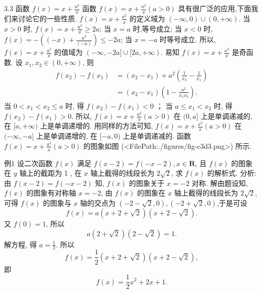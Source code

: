 3.3 函数 $f(x)=x+\frac{a^2}{x}$
函数 $f(x)=x+\frac{a^2}{x}(a>0)$ 具有很广泛的应用,下面我们来讨论它的一些性质.
$f(x)=x+\frac{a^2}{x}$ 的定义域为 $(-\infty, 0) \cup(0,+\infty)$.
当 $x>0$ 时, $f(x)=x+\frac{a^2}{x} \geqslant 2 a$;
当 $x=a$ 时,等号成立;
当 $x<0$ 时, $f(x)=-\left((-x)+\frac{a^2}{(-x)}\right) \leqslant-2 a$;
当 $x=-a$ 时等号成立.
所以, $f(x)=x+\frac{a^2}{x}$ 的值域为 $(-\infty,-2 a] \cup[2 a,+\infty)$.
易知 $f(x)=x+\frac{a^2}{x}$ 是奇函数.
设 $x_1, x_2 \in(0,+\infty)$, 则
$$
\begin{aligned}
f\left(x_2\right)-f\left(x_1\right) & =\left(x_2-x_1\right)+a^2\left(\frac{1}{x_2}-\frac{1}{x_1}\right) \\
& =\left(x_2-x_1\right)\left(1-\frac{a^2}{x_1 x_2}\right) .
\end{aligned}
$$
当 $0<x_1<x_2 \leqslant a$ 时, 得 $f\left(x_2\right)-f\left(x_1\right)<0$ ；
当 $a \leqslant x_1<x_2$ 时, 得 $f\left(x_2\right)-f\left(x_1\right)>0$.
所以, $f(x)=x+\frac{a^2}{x}(a>0)$ 在 $(0, a]$ 上是单调递减的, 在 $[a,+\infty)$ 上是单调递增的.
用同样的方法可知, $f(x)=x+\frac{a^2}{x}(a>0)$ 在 $(-\infty,-a]$ 上是单调递增的, 在 $[-a, 0)$ 上是单调递减的.
函数 $f(x)=x+\frac{a^2}{x}(a>0)$ 的图象如图 (<FilePath:./figures/fig-c3d3.png>) 所示.



例1 设二次函数 $f(x)$ 满足 $f(x-2)=f(-x-2), x \in \mathbf{R}$, 且 $f(x)$ 的图象在 $y$ 轴上的截距为 1 , 在 $x$ 轴上截得的线段长为 $2 \sqrt{2}$, 求 $f(x)$ 的解析式.
分析:由 $f(x-2)=f(-x-2)$ 知, $f(x)$ 的图象关于 $x=-2$ 对称.
解由题设知, $f(x)$ 的图象有对称轴 $x=-2$, 由 $f(x)$ 的图象在 $x$ 轴上截得的线段长为 $2 \sqrt{2}$, 可得 $f(x)$ 的图象与 $x$ 轴的交点为 $(-2-\sqrt{2}, 0),(-2+\sqrt{2}, 0)$,于是可设
$$
f(x)=a(x+2+\sqrt{2})(x+2-\sqrt{2}) .
$$
又 $f(0)=1$, 所以
$$
a(2+\sqrt{2})(2-\sqrt{2})=1 .
$$
解方程, 得 $a=\frac{1}{2}$.
所以
$$
f(x)=\frac{1}{2}(x+2+\sqrt{2})(x+2-\sqrt{2}),
$$
即
$$
f(x)=\frac{1}{2} x^2+2 x+1 .
$$



